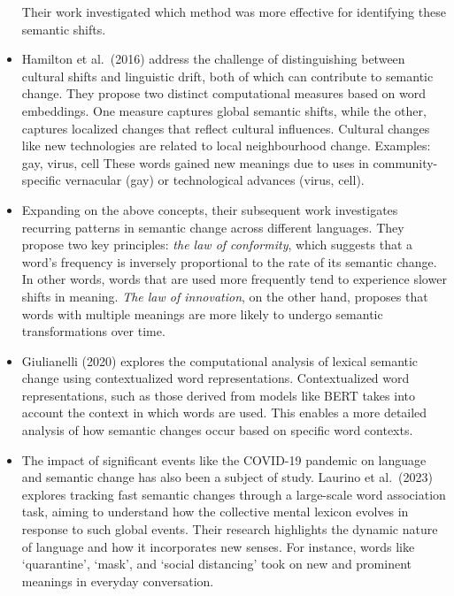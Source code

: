 \begin{itemize}
        Their work investigated which method was more effective for identifying these semantic shifts.
    \item {} Hamilton et al.\ (2016) address the challenge of distinguishing between cultural shifts and linguistic drift, both of which can contribute to semantic change.
        They propose two distinct computational measures based on word embeddings.
        One measure captures global semantic shifts, while the other, captures localized changes that reflect cultural influences.
        Cultural changes like new technologies are related to local neighbourhood change.
        Examples: gay, virus, cell
        These words gained new meanings due to uses in community-specific vernacular (gay) or technological advances (virus, cell).
    \item {} Expanding on the above concepts, their subsequent work investigates recurring patterns in semantic change across different languages.
        They propose two key principles: \emph{the law of conformity}, which suggests that a word's frequency is inversely proportional to the rate of its semantic change.
        In other words, words that are used more frequently tend to experience slower shifts in meaning.
        \emph{The law of innovation}, on the other hand, proposes that words with multiple meanings are more likely to undergo semantic transformations over time.
    \item {} Giulianelli (2020) explores the computational analysis of lexical semantic change using contextualized word representations.
        Contextualized word representations, such as those derived from models like BERT takes into account the context in which words are used.
        This enables a more detailed analysis of how semantic changes occur based on specific word contexts.
    \item {} The impact of significant events like the COVID-19 pandemic on language and semantic change has also been a subject of study.
        Laurino et al.\ (2023) explores tracking fast semantic changes through a large-scale word association task, aiming to understand how the collective mental lexicon evolves in response to such global events.
        Their research highlights the dynamic nature of language and how it incorporates new senses.
        For instance, words like `quarantine', `mask', and `social distancing' took on new and prominent meanings in everyday conversation.
\end{itemize}

